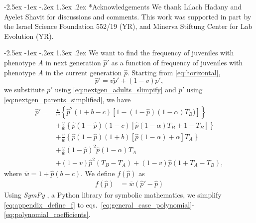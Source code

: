 \documentclass[12pt]{extarticle}
\makeatletter
\renewcommand\section{\@startsection {section}{1}{\z@}%
     {-2.5ex \@plus -1ex \@minus -.2ex}%
     {1.3ex \@plus.2ex}%
    {\Large\bfseries}}
\makeatother
\begin{document}
{%
{\small
\section*{Acknowledgements}
We thank Lilach Hadany and Ayelet Shavit for discussions and comments.
This work was supported in part by
the Israel Science Foundation 552/19 (YR),
and Minerva Stiftung Center for Lab Evolution (YR).
}


\begin{appendices}
\renewcommand{\theequation}{\thesection\arabic{equation}}

\section{} \label{sec:appendixB}
We want to find the frequency of juveniles with phenotype $A$ in next generation $\hat{p}'$ as a function of frequency
of juveniles with phenotype $A$ in the current generation $\hat{p}$.
Starting from \autoref{eq:horizontal},
\begin{equation}\label{eq:appendix_b_1}
  \hat{p}' = v \tilde{p}' + (1-v) p',
\end{equation}
we substitute $p'$ using \autoref{eq:nextgen_adults_slimpify} and $\tilde{p}'$ using \autoref{eq:nextgen_parents_simplified}, we have
\begin{equation}\label{eq:appendix_b_2}
  \begin{aligned}
  \hat{p}'  = & \frac{v}{\bar{w}}\left\{\hat{p}^2(1+b-c)\left[1-(1-\hat{p})(1-\alpha)T_B)\right]\right\} \\
  & + \frac{v}{\bar{w}}\left\{ \hat{p}(1-\hat{p})(1-c)\left[ \hat{p}(1-\alpha)T_B + 1 - T_B \right] \right\} \\
  & + \frac{v}{\bar{w}}\left\{ \hat{p}(1-\hat{p})(1+b)\left[\hat{p}(1-\alpha) + \alpha \right]T_A \right\} \\
  & + \frac{v}{\bar{w}}(1-\hat{p})^2\hat{p}(1-\alpha)T_A \\
  & + (1-v)\hat{p}^2(T_B-T_A) + (1-v)\hat{p}(1+T_A-T_B),
\end{aligned}
\end{equation}
where $\bar{w} = 1 + \hat{p}(b-c)$. 
We define $f(\hat{p})$ as
\begin{equation} \label{eq:appendix_define_f}
\begin{aligned}
      f(\hat{p}) &= \bar{w}(\hat{p}' - \hat{p})
\end{aligned}
\end{equation}
Using \emph{SymPy} \citep{Meurer2017}, a Python library for symbolic mathematics, we simplify \autoref{eq:appendix_define_f} to 
eqs.~\ref{eq:general_case_polynomial}-\ref{eq:polynomial_coefficients}.


\end{appendices}}
\end{document}
